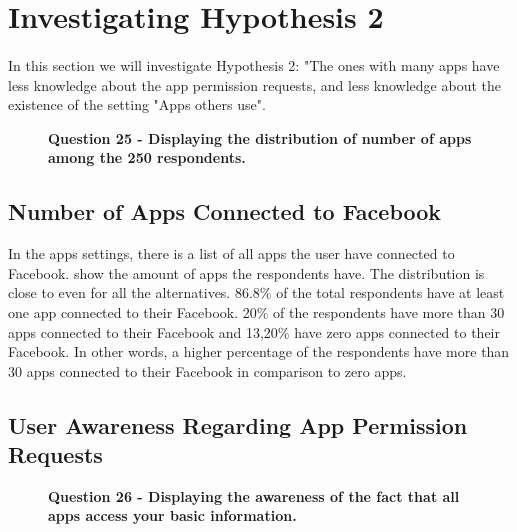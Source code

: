 \section{Investigating Hypothesis 2}

\paragraph{}
In this section we will investigate Hypothesis 2: "The ones with many apps have less knowledge about the app permission requests, and less knowledge about the existence of the setting "Apps others use". 

\begin{figure}[h!]
\centering
{}
\caption[Question 25 - Displaying the distribution of number of apps among the 250 respondents]{\textbf{Question 25 - Displaying the distribution of number of apps among the 250 respondents.}} 
\label{fig:appsyouuse}
\end{figure}

\subsection{Number of Apps Connected to Facebook}
In the apps settings, there is a list of all apps the user have connected to Facebook.  show the amount of apps the respondents have. The distribution is close to even for all the alternatives. 86.8\% of the total respondents have at least one app connected to their Facebook. 20\% of the respondents have more than 30 apps connected to their Facebook and 13,20\% have zero apps connected to their Facebook. In other words, a higher percentage of the respondents have more than 30 apps connected to their Facebook in comparison to zero apps. 

\subsection{User Awareness Regarding App Permission Requests}
\begin{figure}[h!]
\centering
{}
\caption[Question 26 - Displaying the awareness of the fact that all apps access your basic information]{\textbf{Question 26 - Displaying the awareness of the fact that all apps access your basic information.}} 
\label{fig:appsaccessbasicinfo}
\end{figure}

